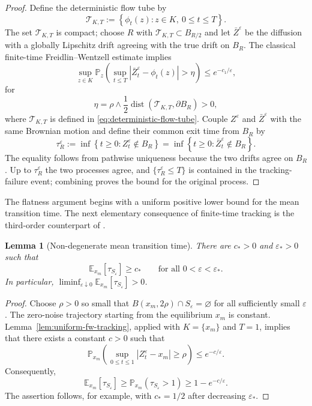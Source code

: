 \documentclass[11pt]{article}
\numberwithin{equation}{section}
\theoremstyle{plain}
\newtheorem{lemma}[theorem]{Lemma}
\theoremstyle{definition}
\theoremstyle{remark}
\newcommand{\eps}{\varepsilon}
\newcommand{\dist}{\operatorname{dist}}
\newcommand{\E}{\mathbb E}
\newcommand{\Pbb}{\mathbb P}
\begin{document}
\begin{proof}
Define the deterministic flow tube by
\begin{equation}
\label{eq:deterministic-flow-tube}
\mathscr T_{K,T}
:=
\left\{\phi_t(z):z\in K,\ 0\le t\le T\right\}.
\end{equation}
The set $\mathscr T_{K,T}$ is compact; choose $R$ with
$\mathscr T_{K,T}\subset B_{R/2}$ and let $\bar Z^\eps$ be the diffusion with a
globally Lipschitz drift agreeing with the true drift on $B_R$.  The classical
finite-time Freidlin--Wentzell estimate
\cite[Chapter~4]{FreidlinWentzell2012} implies
\[
\sup_{z\in K}\Pbb_z\left(\sup_{t\le T}\left|\bar Z_t^\eps-\phi_t(z)\right|>\eta\right)\le e^{-c_1/\eps},
\]
for
\[
\eta
=
\rho\wedge\frac12
\dist\left(\mathscr T_{K,T},\partial B_R\right)>0,
\]
where $\mathscr T_{K,T}$ is defined in \eqref{eq:deterministic-flow-tube}.  Couple
$Z^\eps$ and $\bar Z^\eps$ with the same Brownian motion and define their
common exit time from $B_R$ by
\[
\tau_R^\eps:=\inf\left\{t\ge0:Z_t^\eps\notin B_R\right\}
=\inf\left\{t\ge0:\bar Z_t^\eps\notin B_R\right\}.
\]
The equality follows from pathwise uniqueness because the two drifts agree
on $B_R$.  Up to $\tau_R^\eps$ the two processes agree, and
$\{\tau_R^\eps\le T\}$
is contained in
the tracking-failure event; combining proves the bound for the original process.
\end{proof}

The flatness argument begins with a uniform positive lower bound for the mean
transition time.  The next elementary consequence of finite-time tracking is
the third-order counterpart of
\cite[Lemma~6.1]{LeeRamilSeo2026}.

\begin{lemma}[Non-degenerate mean transition time]
\label{lem:nondegenerate-mean-transition-time}
There are $c_*>0$ and $\eps_*>0$ such that
\[
\E_{x_m}[\tau_{S_\eps}]\ge c_*
\qquad\text{for all }0<\eps<\eps_*.
\]
In particular,
$\liminf_{\eps\downarrow0}\E_{x_m}[\tau_{S_\eps}]>0$.
\end{lemma}

\begin{proof}
Choose $\rho>0$ so small that
$B(x_m,2\rho)\cap S_\eps=\varnothing$ for all sufficiently small $\eps$.
The zero-noise trajectory starting from the equilibrium $x_m$ is constant.
Lemma~\ref{lem:uniform-fw-tracking}, applied with $K=\{x_m\}$ and $T=1$,
implies that there exists a constant $c>0$ such that
\[
\Pbb_{x_m}\!\left(\sup_{0\le t\le1}\left|Z_t^\eps-x_m\right|\ge\rho\right)
\le e^{-c/\eps}.
\]
Consequently,
\[
\E_{x_m}[\tau_{S_\eps}]
\ge \Pbb_{x_m}(\tau_{S_\eps}>1)
\ge1-e^{-c/\eps}.
\]
The assertion follows, for example, with $c_*=1/2$ after decreasing
$\eps_*$.
\end{proof}
\end{document}
